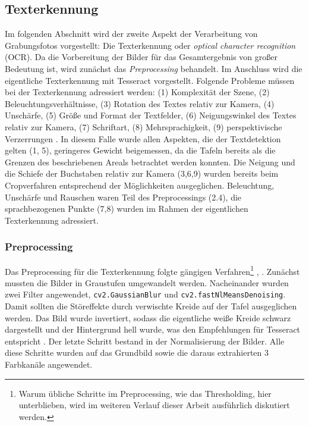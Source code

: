 \subsection{Texterkennung}

Im folgenden Abschnitt wird der zweite Aspekt der Verarbeitung von Grabungsfotos vorgestellt: Die Texterkennung oder \textit{optical character recognition} (OCR). Da die Vorbereitung der Bilder für das Gesamtergebnis von großer Bedeutung ist, wird zunächst das \textit{Preprocessing} behandelt. Im Anschluss wird die eigentliche Texterkennung mit Tesseract vorgestellt.
Folgende Probleme müssen bei der Texterkennung adressiert werden: (1) Komplexität der Szene, (2) Beleuchtungsverhältnisse, (3) Rotation des Textes relativ zur Kamera, (4) Unschärfe, (5) Größe und Format der Textfelder, (6) Neigungswinkel des Textes relativ zur Kamera, (7) Schriftart, (8) Mehrsprachigkeit, (9) perspektivische Verzerrungen \cite{hamad}. In diesem Falle wurde allen Aspekten, die der Textdetektion gelten (1, 5), geringeres Gewicht beigemessen, da die Tafeln bereits als die Grenzen des beschriebenen Areals betrachtet werden konnten. Die Neigung und die Schiefe der Buchstaben relativ zur Kamera (3,6,9) wurden bereits beim Cropverfahren entsprechend der Möglichkeiten ausgeglichen. Beleuchtung, Unschärfe und Rauschen waren Teil des Preprocessings (2.4), die sprachbezogenen Punkte (7,8) wurden im Rahmen der eigentlichen Texterkennung adressiert.

\subsubsection{Preprocessing}

Das Preprocessing für die Texterkennung folgte gängigen Verfahren\footnote{Warum übliche Schritte im Preprocessing, wie das Thresholding, hier unterblieben, wird im weiteren Verlauf dieser Arbeit ausführlich diskutiert werden.} \cite{jenilshah}, \cite{sumedhahallale}. Zunächst mussten die Bilder in Graustufen umgewandelt werden. Nacheinander wurden zwei Filter angewendet, \verb|cv2.GaussianBlur| und \verb|cv2.fastNlMeansDenoising|. Damit sollten die Störeffekte durch verwischte Kreide auf der Tafel ausgeglichen werden. Das Bild wurde invertiert, sodass die eigentliche weiße Kreide schwarz dargestellt und der Hintergrund hell wurde, was den Empfehlungen für Tesseract entspricht \cite{tesseractoptimum}. Der letzte Schritt bestand in der Normalisierung der Bilder. Alle diese Schritte wurden auf das Grundbild sowie die daraus extrahierten 3 Farbkanäle angewendet.

